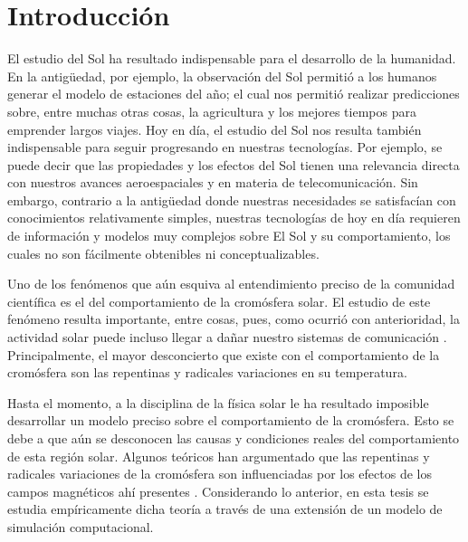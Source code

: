 \documentclass[9pt]{book}
\begin{document}
  \renewcommand{\thepage}{\arabic{page}}
  \setcounter{page}{1}
  \renewcommand{\tablename}{Tabla}

 \chapter{Introducci\'on}




El estudio del Sol ha resultado indispensable para el desarrollo de la humanidad. En la antig\"uedad, por ejemplo, la observaci\'on del Sol permiti\'o a los humanos generar el modelo de estaciones del a\~no; el cual nos permiti\'o realizar predicciones sobre, entre muchas otras cosas, la agricultura y los mejores tiempos para emprender largos viajes. Hoy en d\'ia, el estudio del Sol nos resulta tambi\'en indispensable para seguir progresando en nuestras tecnolog\'ias. Por ejemplo, se puede decir que las propiedades y los efectos del Sol tienen una relevancia directa con nuestros avances aeroespaciales y en materia de telecomunicaci\'on. Sin embargo, contrario a la antig\"uedad donde nuestras necesidades se satisfac\'ian con conocimientos relativamente simples, nuestras tecnolog\'ias de hoy en d\'ia requieren de informaci\'on y modelos muy complejos sobre El Sol y su comportamiento, los cuales no son f\'acilmente obtenibles ni conceptualizables.

Uno de los fen\'omenos que a\'un esquiva al entendimiento preciso de la comunidad cient\'ifica es el del comportamiento de la crom\'osfera solar. El estudio de este fen\'omeno resulta importante, entre cosas, pues,  como ocurri\'o con anterioridad, la actividad solar puede incluso llegar a da\~nar nuestro sistemas de comunicaci\'on \cite{carrington}. Principalmente, el mayor desconcierto que existe con el comportamiento de la crom\'osfera son las repentinas y radicales variaciones en su temperatura.

Hasta el momento, a la disciplina de la f\'isica solar le ha resultado imposible desarrollar un modelo preciso sobre el comportamiento de la crom\'osfera. Esto se debe a que a\'un se desconocen las causas y condiciones reales del comportamiento de esta regi\'on solar. Algunos te\'oricos han argumentado que las repentinas y radicales variaciones de la crom\'osfera son influenciadas por los efectos de los campos magn\'eticos ah\'i presentes \cite{chromotemp}. Considerando lo anterior, en esta tesis se estudia emp\'iricamente dicha teor\'ia a trav\'es de una extensi\'on de un modelo de simulaci\'on computacional.
\end{document}
